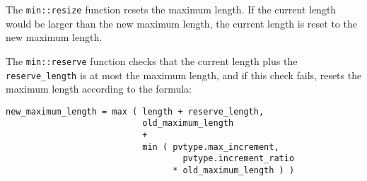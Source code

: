 \documentclass[12pt]{article}
\newenvironment{indpar}[1][0.3in]%
	{\begin{list}{}%
		     {\setlength{\itemsep}{0in}%
		      \setlength{\topsep}{0in}%
		      \setlength{\parsep}{1ex}%
		      \setlength{\labelwidth}{#1}%
		      \setlength{\leftmargin}{#1}%
		      \addtolength{\leftmargin}{\labelsep}}%
	 \item}%
	{\end{list}}
\begin{document}
The \verb|min::resize| function resets the maximum length.  If
the current length would be larger than the new maximum length,
the current length is reset to the new maximum length.

The \verb|min::reserve| function checks that
the current length plus the \verb|reserve_length| is
at most the maximum length, and if this check fails,
resets the maximum length according to the formula:
\begin{indpar}\begin{verbatim}
new_maximum_length = max ( length + reserve_length,
                           old_maximum_length
                           +
                           min ( pvtype.max_increment,
                                   pvtype.increment_ratio
                                 * old_maximum_length ) )
\end{verbatim}\end{indpar}\label{PACKED-VEC-EXPANSION-FORMULA}
\end{document}
